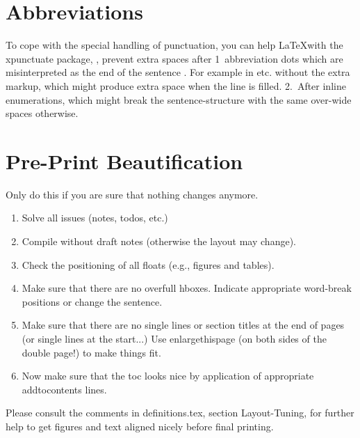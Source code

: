 \section{Abbreviations}
\label{sec:abbreviations}

To cope with the special handling of punctuation, you can help \LaTeX with the xpunctuate package, \ie, prevent extra spaces after 1\xperiod{}~abbreviation dots which are misinterpreted as the end of the sentence \etc. For example in etc. without the extra markup, which might produce extra space when the line is filled. 2.~After inline enumerations, which might break the sentence-structure with the same over-wide spaces otherwise.


\section{Pre-Print Beautification}
\label{sec:pre-print-beaut}

Only do this if you are sure that nothing changes anymore.

\begin{enumerate}
\item Solve all issues (notes, todos, etc.)
\item Compile without draft notes (otherwise the layout may change).
\item Check the positioning of all floats (e.g., figures and tables).
\item Make sure that there are no overfull hboxes. Indicate appropriate word-break positions or change the sentence.
\item Make sure that there are no single lines or section titles at the end of pages (or single lines at the start...) Use enlargethispage (on both sides of the double page!) to make things fit.
\item Now make sure that the toc looks nice by application of appropriate addtocontents lines.
\end{enumerate}

Please consult the comments in definitions.tex, section Layout-Tuning, for further help to get figures and text aligned nicely before final printing.

\enlargethispage{4\baselineskip}


